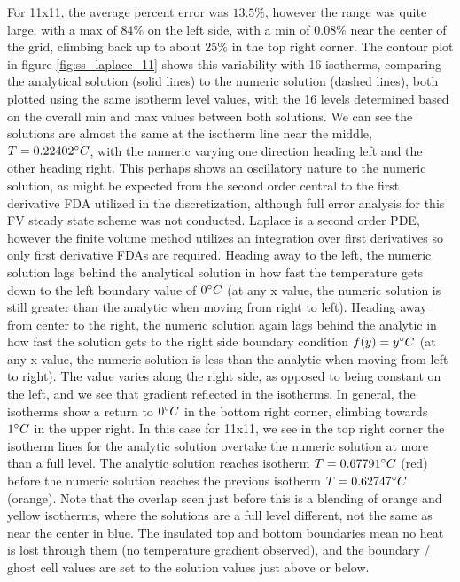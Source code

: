 \documentclass[conf]{new-aiaa}
\begin{document}
For 11x11, the average percent error was $13.5\%$, however the range was quite large, with a max of $84\%$ on the left side, with a min of $0.08\%$ near the center of the grid, climbing back up to about $25\%$ in the top right corner.  The contour plot in figure \ref{fig:ss_laplace_11} shows this variability with 16 isotherms, comparing the analytical solution (solid lines) to the numeric solution (dashed lines), both plotted using the same isotherm level values, with the 16 levels determined based on the overall min and max values between both solutions.  We can see the solutions are almost the same at the isotherm line near the middle, $T=0.22402\degree C$, with the numeric varying one direction heading left and the other heading right.  This perhaps shows an oscillatory nature to the numeric solution, as might be expected from the second order central to the first derivative FDA utilized in the discretization, although full error analysis for this FV steady state scheme was not conducted.  Laplace is a second order PDE, however the finite volume method utilizes an integration over first derivatives so only first derivative FDAs are required.  Heading away to the left, the numeric solution lags behind the analytical solution in how fast the temperature gets down to the left boundary value of $0\degree C$ (at any x value, the numeric solution is still greater than the analytic when moving from right to left).  Heading away from center to the right, the numeric solution again lags behind the analytic in how fast the solution gets to the right side boundary condition $f(y)=y\degree C$ (at any x value, the numeric solution is less than the analytic when moving from left to right).  The value varies along the right side, as opposed to being constant on the left, and we see that gradient reflected in the isotherms.  In general, the isotherms show a return to $0\degree C$ in the bottom right corner, climbing towards $1\degree C$ in the upper right.  In this case for 11x11, we see in the top right corner the isotherm lines for the analytic solution overtake the numeric solution at more than a full level.  The analytic solution reaches isotherm $T=0.67791\degree C$ (red) before the numeric solution reaches the previous isotherm $T=0.62747\degree C$ (orange).  Note that the overlap seen just before this is a blending of orange and yellow isotherms, where the solutions are a full level different, not the same as near the center in blue.  The insulated top and bottom boundaries mean no heat is lost through them (no temperature gradient observed), and the boundary / ghost cell values are set to the solution values just above or below.
\end{document}
